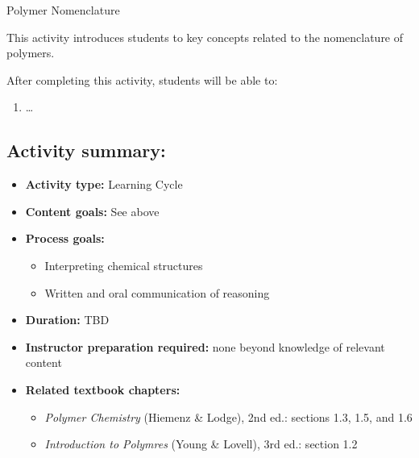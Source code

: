 %
%
%
%

\renewcommand{\figpath}{content/intro/nomenclature/figs}
\renewcommand{\labelbase}{nomenclature}

\begin{activity}{Polymer Nomenclature}

\begin{instructornotes}

	This activity introduces students to key concepts related to the nomenclature of polymers.
	
	After completing this activity, students will be able to:
			\begin{enumerate}
				\item \dots
			\end{enumerate}
			
	\subsection*{Activity summary:}
	\begin{itemize}
		\item \textbf{Activity type:} Learning Cycle
		\item \textbf{Content goals:} See above
		\item \textbf{Process goals:} %
			\begin{itemize}
				\item Interpreting chemical structures
				\item Written and oral communication of reasoning
			\end{itemize}
		\item \textbf{Duration:} TBD
		\item \textbf{Instructor preparation required:} none beyond knowledge of relevant content
		\item \textbf{Related textbook chapters:}
			\begin{itemize}
				\item \emph{Polymer Chemistry} (Hiemenz \& Lodge), 2nd ed.: sections 1.3, 1.5, and 1.6
				\item \emph{Introduction to Polymres} (Young \& Lovell), 3rd ed.: section 1.2
			\end{itemize}
	\end{itemize}


\end{instructornotes}
\end{activity}
